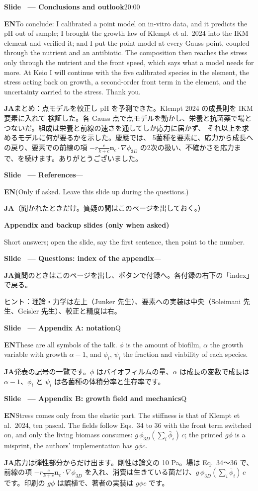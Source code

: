 \documentclass[11pt,a4paper]{article}
\newcounter{sl}
\newcommand{\slide}[2]{\stepcounter{sl}\vspace{8pt}%
  {\color{c3}\large\bfseries Slide \thesl\ --- #1}\hfill{\small #2}\par\vspace{2pt}}
\newcommand{\EN}{\textbf{EN}\quad}
\newcommand{\JA}{\par\textbf{JA}\quad}
\newcommand{\hint}[1]{\par{\color{gray}\small ヒント：#1}}
\begin{document}
\slide{Conclusions and outlook}{20:00}
\EN To conclude: I calibrated a point model on in-vitro data, and it predicts
the pH out of sample; I brought the growth law of Klempt et al.\ 2024 into
the IKM element and verified it; and I put the point model at every Gauss
point, coupled through the nutrient and an antibiotic. The composition then
reaches the stress only through the nutrient and the front speed, which says what a model needs for more. At Keio I will
continue with the five calibrated species in the element, the stress acting back on growth, a second-order
front term in the element, and the uncertainty carried to the stress.
Thank you.
\JA まとめ：点モデルを較正し pH を予測できた。Klempt 2024 の成長則を IKM 要素に入れて
検証した。各 Gauss 点で点モデルを動かし、栄養と抗菌薬で場とつないだ。組成は栄養と前線の速さを通してしか応力に届かず、
それ以上を求めるモデルに何が要るかを示した。慶應では、
5菌種を要素に、応力から成長への戻り、要素での前線の項 $-r\frac{c}{k+c}\mathbf n_c\cdot\nabla\phi_{3D}$ の2次の扱い、不確かさを応力まで、を続けます。ありがとうございました。

\slide{References}{---}
\EN (Only if asked. Leave this slide up during the questions.)
\JA （聞かれたときだけ。質疑の間はこのページを出しておく。）

\vspace{10pt}
{\large\bfseries Appendix and backup slides (only when asked)}\par
Short answers; open the slide, say the first sentence, then point to the number.

\slide{Questions: index of the appendix}{---}
\JA 質問のときはこのページを出し、ボタンで付録へ。各付録の右下の「index」で戻る。
\hint{理論・力学は左上（Junker 先生）、要素への実装は中央（Soleimani 先生、Geisler 先生）、較正と精度は右。}

\slide{Appendix A: notation}{Q}
\EN These are all symbols of the talk. $\phi$ is the amount of biofilm, $\alpha$ the growth variable with growth $\alpha-1$, and $\phi_i$, $\psi_i$ the fraction and viability of each species.
\JA 発表の記号の一覧です。$\phi$ はバイオフィルムの量、$\alpha$ は成長の変数で成長は $\alpha-1$、$\phi_i$ と $\psi_i$ は各菌種の体積分率と生存率です。

\slide{Appendix B: growth field and mechanics}{Q}
\EN Stress comes only from the elastic part. The stiffness is that of Klempt et al.\ 2024, ten pascal. The fields follow Eqs.~34 to 36 with the front term switched on, and only the living biomass consumes: $g\,\phi_{3D}(\sum_i\bar\phi_i)\,c$; the printed $g\phi$ is a misprint, the authors' implementation has $g\phi c$.
\JA 応力は弾性部分からだけ出ます。剛性は論文の 10 Pa。場は Eq.~34〜36 で、前線の項 $-r\frac{c}{k+c}\mathbf n_c\cdot\nabla\phi_{3D}$ を入れ、消費は生きている菌だけ、$g\,\phi_{3D}(\sum_i\bar\phi_i)\,c$ です。印刷の $g\phi$ は誤植で、著者の実装は $g\phi c$ です。
\end{document}
